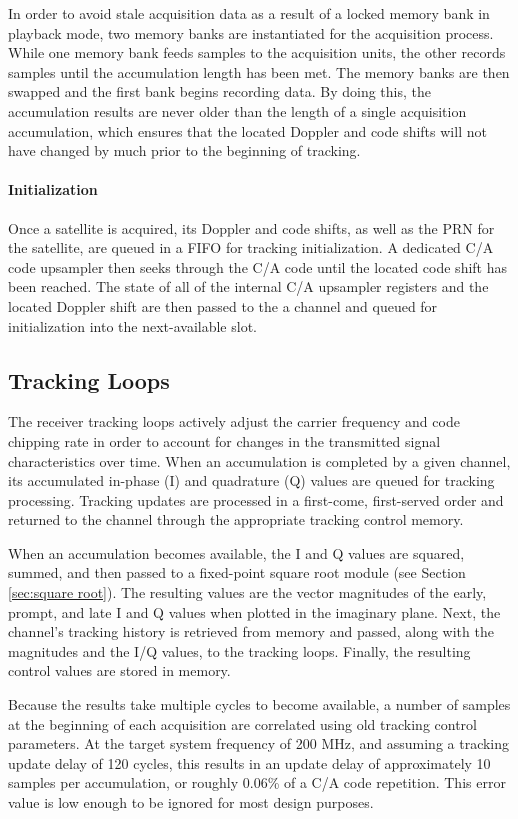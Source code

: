 \documentclass[12pt]{article}
\begin{document}
In order to avoid stale acquisition data as a result of a locked memory bank in playback mode, two memory banks are instantiated for the acquisition process. While one memory bank feeds samples to the acquisition units, the other records samples until the accumulation length has been met. The memory banks are then swapped and the first bank begins recording data. By doing this, the accumulation results are never older than the length of a single acquisition accumulation, which ensures that the located Doppler and code shifts will not have changed by much prior to the beginning of tracking.

\paragraph{Initialization}
Once a satellite is acquired, its Doppler and code shifts, as well as the PRN for the satellite, are queued in a FIFO for tracking initialization. A dedicated C/A code upsampler then seeks through the C/A code until the located code shift has been reached. The state of all of the internal C/A upsampler registers and the located Doppler shift are then passed to the a channel and queued for initialization into the next-available slot.

\subsection{Tracking Loops}
\label{sec:tracking loops}
The receiver tracking loops actively adjust the carrier frequency and code chipping rate in order to account for changes in the transmitted signal characteristics over time. When an accumulation is completed by a given channel, its accumulated in-phase (I) and quadrature (Q) values are queued for tracking processing. Tracking updates are processed in a first-come, first-served order and returned to the channel through the appropriate tracking control memory.

When an accumulation becomes available, the I and Q values are squared, summed, and then passed to a fixed-point square root module (see Section \ref{sec:square root}). The resulting values are the vector magnitudes of the early, prompt, and late I and Q values when plotted in the imaginary plane. Next, the channel's tracking history is retrieved from memory and passed, along with the magnitudes and the I/Q values, to the tracking loops. Finally, the resulting control values are stored in memory.

Because the results take multiple cycles to become available, a number of samples at the beginning of each acquisition are correlated using old tracking control parameters. At the target system frequency of 200 MHz, and assuming a tracking update delay of 120 cycles, this results in an update delay of approximately 10 samples per accumulation, or roughly 0.06\% of a C/A code repetition. This error value is low enough to be ignored for most design purposes.
\end{document}

